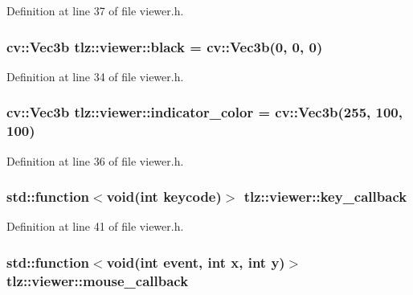 Definition at line 37 of file viewer.\+h.

\subsubsection[{\texorpdfstring{black}{black}}]{\setlength{\rightskip}{0pt plus 5cm}cv\+::\+Vec3b tlz\+::viewer\+::black = cv\+::\+Vec3b(0, 0, 0)}\hypertarget{classtlz_1_1viewer_af7c1c138d35a19bee709bc368f10b7fa}{}\label{classtlz_1_1viewer_af7c1c138d35a19bee709bc368f10b7fa}


Definition at line 34 of file viewer.\+h.

\subsubsection[{\texorpdfstring{indicator\+\_\+color}{indicator_color}}]{\setlength{\rightskip}{0pt plus 5cm}cv\+::\+Vec3b tlz\+::viewer\+::indicator\+\_\+color = cv\+::\+Vec3b(255, 100, 100)}\hypertarget{classtlz_1_1viewer_a0d5822b6c9ca68bf0edf44d6ff017937}{}\label{classtlz_1_1viewer_a0d5822b6c9ca68bf0edf44d6ff017937}


Definition at line 36 of file viewer.\+h.

\subsubsection[{\texorpdfstring{key\+\_\+callback}{key_callback}}]{\setlength{\rightskip}{0pt plus 5cm}std\+::function$<$void(int keycode)$>$ tlz\+::viewer\+::key\+\_\+callback}\hypertarget{classtlz_1_1viewer_a2eb7558722a69604c1d9c96c1b1dcc83}{}\label{classtlz_1_1viewer_a2eb7558722a69604c1d9c96c1b1dcc83}


Definition at line 41 of file viewer.\+h.

\subsubsection[{\texorpdfstring{mouse\+\_\+callback}{mouse_callback}}]{\setlength{\rightskip}{0pt plus 5cm}std\+::function$<$void(int event, int x, int y)$>$ tlz\+::viewer\+::mouse\+\_\+callback}\hypertarget{classtlz_1_1viewer_a8b095fdc711fecee7f8c5916e0fcc351}{}\label{classtlz_1_1viewer_a8b095fdc711fecee7f8c5916e0fcc351}


